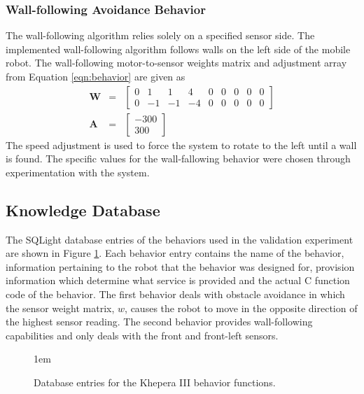       \subsubsection{Wall-following Avoidance Behavior}
        The wall-following algorithm relies solely on a specified sensor side.
        The implemented wall-following algorithm follows walls on the left side
          of the mobile robot.
        The wall-following motor-to-sensor weights matrix and adjustment array
          from Equation \ref{eqn:behavior} are given as
        \begin{eqnarray*}
          \mathbf{W}&=&\left[
          \begin{array}{ccccccccc}
           0 &  1 &  1 &  4 &  0 & 0 & 0 &0 &0\\
           0 & -1 & -1 & -4 &  0 & 0 & 0 &0 &0
          \end{array}
          \right]\\
          \mathbf{A}&=&\left[
          \begin{array}{c}
           -300 \\
            300
          \end{array}
          \right]
        \end{eqnarray*}
        The speed adjustment is used to force the system to rotate to the left 
          until a wall is found.
        The specific values for the wall-fallowing behavior were chosen through 
          experimentation with the system.

    \subsection{Knowledge Database}
    The SQLight database entries of the behaviors used in the validation 
      experiment are shown in Figure \ref{fig:db_behaviors}.
    Each behavior entry contains the name of the behavior, information
      pertaining to the robot that the behavior was designed for,
      provision information which determine what service is provided and the
      actual C function code of the behavior.
    The first behavior deals with obstacle avoidance in which the sensor
      weight matrix, $w$, causes the robot to move in the opposite direction
      of the highest sensor reading.
    The second behavior provides wall-following capabilities and only deals
      with the front and front-left sensors.
    \begin{figure}%
      \begin{center}
      \footnotesize{\baselineskip 1em }
      \end{center}
      \caption{Database entries for the Khepera III behavior functions.}
      \label{fig:db_behaviors}
    \end{figure}
  
